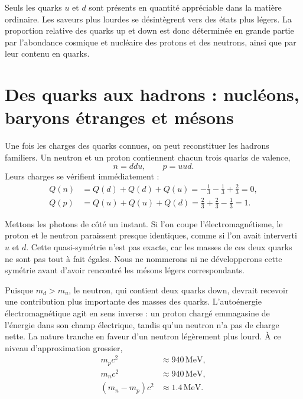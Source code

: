 Seuls les quarks \(u\) et \(d\) sont présents en quantité appréciable dans la matière ordinaire. Les saveurs plus lourdes se désintègrent vers des états plus légers. La proportion relative des quarks up et down est donc déterminée en grande partie par l’abondance cosmique et nucléaire des protons et des neutrons, ainsi que par leur contenu en quarks.

\begin{classroomqa}
\end{classroomqa}

\section{Des quarks aux hadrons : nucléons, baryons étranges et mésons}

Une fois les charges des quarks connues, on peut reconstituer les hadrons familiers. Un neutron et un proton contiennent chacun trois quarks de valence,
\begin{equation}
n=ddu,
\qquad
p=uud.
\end{equation}
Leurs charges se vérifient immédiatement :
\begin{align}
Q(n) &= Q(d)+Q(d)+Q(u)
= -\frac13-\frac13+\frac23
=0,\\
Q(p) &= Q(u)+Q(u)+Q(d)
= \frac23+\frac23-\frac13
=1.
\end{align}

Mettons les photons de côté un instant. Si l’on coupe l’électromagnétisme, le proton et le neutron paraissent presque identiques, comme si l’on avait interverti \(u\) et \(d\). Cette quasi-symétrie n’est pas exacte, car les masses de ces deux quarks ne sont pas tout à fait égales. Nous ne nommerons ni ne développerons cette symétrie avant d’avoir rencontré les mésons légers correspondants.

Puisque \(m_d>m_u\), le neutron, qui contient deux quarks down, devrait recevoir une contribution plus importante des masses des quarks. L’autoénergie électromagnétique agit en sens inverse : un proton chargé emmagasine de l’énergie dans son champ électrique, tandis qu’un neutron n’a pas de charge nette. La nature tranche en faveur d’un neutron légèrement plus lourd. À ce niveau d’approximation grossier,
\begin{align}
m_pc^2&\approx940\,\mathrm{MeV},\\
m_nc^2&\approx940\,\mathrm{MeV},\\
(m_n-m_p)c^2&\approx1.4\,\mathrm{MeV}.
\end{align}

